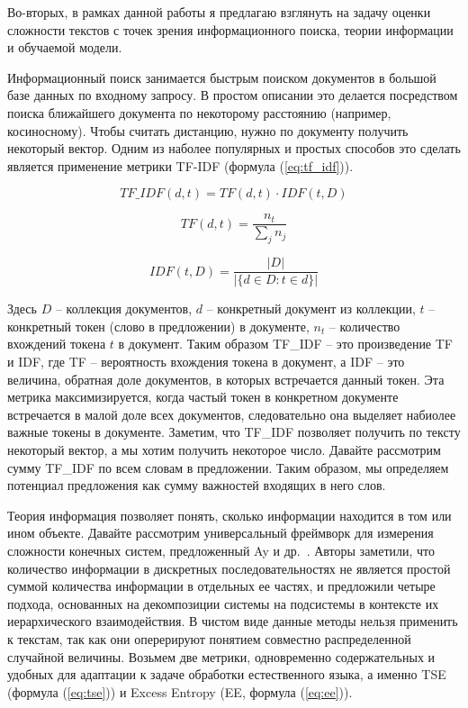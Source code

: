 \documentclass{spbau-diploma}
\begin{document}
Во-вторых, в рамках данной работы я предлагаю взглянуть на задачу оценки сложности текстов с точек зрения информационного поиска, теории информации и обучаемой модели.

Информационный поиск занимается быстрым поиском документов в большой базе данных по входному запросу. В простом описании это делается посредством поиска ближайшего документа по некоторому расстоянию (например, косиносному). Чтобы считать дистанцию, нужно по документу получить некоторый вектор. Одним из наболее популярных и простых способов это сделать является применение метрики TF-IDF (формула (\ref{eq:tf_idf})).

\begin{equation} \label{eq:tf_idf}
TF\_IDF(d,t) = TF(d,t)\cdot IDF(t,D)
\end{equation}

\begin{equation} \label{eq:tf}
TF(d,t) = \frac{n_t}{\sum\limits_{j}n_j}
\end{equation}

\begin{equation} \label{eq:idf}
IDF(t,D) = \frac{|D|}{|\{d\in D\colon t \in d\}|}
\end{equation}

Здесь $D$ -- коллекция документов, $d$ -- конкретный документ из коллекции, $t$ -- конкретный токен (слово в предложении) в документе, $n_t$ -- количество вхождений токена $t$ в документ. Таким образом TF\_IDF -- это произведение TF и IDF, где TF -- вероятность вхождения токена в документ, а IDF -- это величина, обратная доле документов, в которых встречается данный токен. Эта метрика максимизируется, когда частый токен в конкретном документе встречается в малой доле всех документов, следовательно она выделяет набиолее важные токены в документе. Заметим, что TF\_IDF позволяет получить по тексту некоторый вектор, а мы хотим получить некоторое число. Давайте рассмотрим сумму TF\_IDF по всем словам в предложении. Таким образом, мы определяем потенциал предложения как сумму важностей входящих в него слов.

Теория информация позволяет понять, сколько информации находится в том или ином объекте. Давайте рассмотрим универсальный фреймворк для измерения сложности конечных систем, предложенный Ay и др.~\cite{ay2006unifying}. Авторы заметили, что количество информации в дискретных последовательностях не является простой суммой количества информации в отдельных ее частях, и предложили четыре подхода, основанных на декомпозиции системы на подсистемы в контексте их иерархического взаимодействия. В чистом виде данные методы нельзя применить к текстам, так как они оперерируют понятием совместно распределенной случайной величины. Возьмем две метрики, одновременно содержательных и удобных для адаптации к задаче обработки естественного языка, а именно TSE (формула (\ref{eq:tse})) и Excess Entropy (EE, формула (\ref{eq:ee})).
\end{document}
